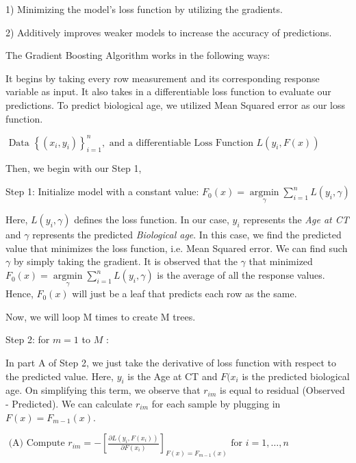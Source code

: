 \documentclass{article}
\begin{document}
\hspace*{10mm}1) Minimizing the model's loss function by utilizing the gradients.

\hspace*{10mm}2) Additively improves weaker models to increase the accuracy of predictions.

The Gradient Boosting Algorithm works in the following ways:

It begins by taking every row measurement and its corresponding response variable as input. It also takes in a differentiable loss function to evaluate our predictions. To predict biological age, we utilized Mean Squared error as our loss function.

\hspace*{10mm}$\text { Data }\left\{\left(x_{i}, y_{i}\right)\right\}_{i=1}^{n}, \text { and a differentiable Loss Function } L\left(y_{i}, F(x)\right)$

Then, we begin with our Step 1, 

\hspace*{10mm}Step 1: Initialize model with a constant value: $F_{0}(x)=\underset{\gamma}{\operatorname{argmin}} \sum_{i=1}^{n} L\left(y_{i}, \gamma\right)$

Here,  $L(y_{i}, \gamma)$ defines the loss function. In our case, $y_{i}$ represents the \emph{Age at CT} and $\gamma$ represents the predicted \emph{Biological age}. In this case, we find the predicted value that minimizes the loss function, i.e. Mean Squared error. We can find such $\gamma$ by simply taking the gradient. It is observed that the $\gamma$ that minimized $F_{0}(x)=\underset{\gamma}{\operatorname{argmin}} \sum_{i=1}^{n} L(y_{i}, \gamma)$ is the average of all the response values. Hence, $F_{0}(x)$ will just be a leaf that predicts each row as the same. 

Now, we will loop M times to create M trees. 

\hspace*{10mm}Step 2: for $m=1$ to $M$ :

In part A of Step 2, we just take the derivative of loss function with respect to the predicted value. Here, $y_{i}$ is the Age at CT and $F(x_{i}$ is the predicted biological age. On simplifying this term, we observe that $r_{i m}$ is equal to residual (Observed - Predicted). We can calculate $r_{i m}$ for each sample by plugging in $F(x)=F_{m-1}(x)$. 

\hspace*{10mm}$\text { (A) Compute } r_{i m}=-\left[\frac{\partial L\left(y_{i}, F\left(x_{i}\right)\right)}{\partial F\left(x_{i}\right)}\right]_{F(x)=F_{m-1}(x)} \text { for } i=1, \ldots, n$
\end{document}
